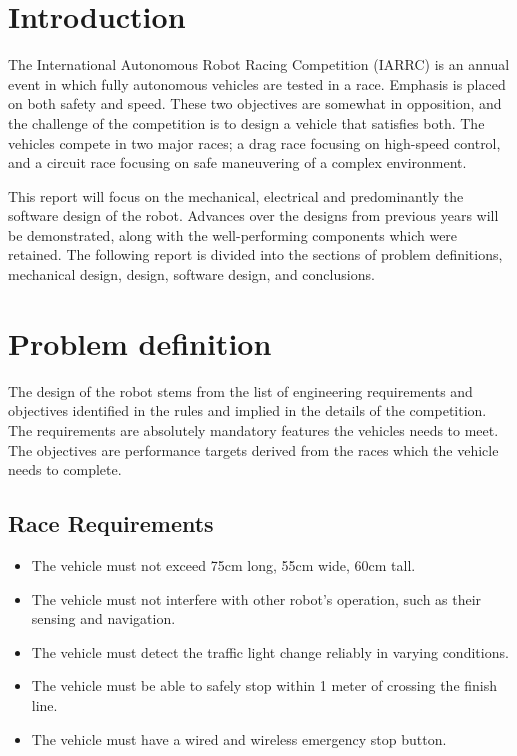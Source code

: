 \documentclass[11pt,journal]{IEEEtran}
\begin{document}
%
\IEEEpeerreviewmaketitle



\section{Introduction}
The International Autonomous Robot Racing Competition (IARRC) is an annual event in which fully autonomous vehicles are tested in a race. Emphasis is placed on both safety and speed. These two objectives are somewhat in opposition, and the challenge of the competition is to design a vehicle that satisfies both. The vehicles compete in two major races; a drag race focusing on high-speed control, and a circuit race focusing on safe maneuvering of a complex environment. 

This report will focus on the mechanical, electrical and predominantly the software design of the robot. Advances over the designs from previous years will be demonstrated, along with the well-performing components which were retained. The following report is divided into the sections of problem definitions, mechanical design, design, software design, and conclusions.

\section{Problem definition}
The design of the robot stems from the list of engineering requirements and objectives identified in the rules and implied in the details of the competition. The requirements are absolutely mandatory features the vehicles needs to meet. The objectives are performance targets derived from the races which the vehicle needs to complete.

\subsection{Race Requirements}

\begin{itemize}
  \item The vehicle must not exceed 75cm long, 55cm wide, 60cm tall.
  \item The vehicle must not interfere with other robot's operation, such as their sensing and navigation.
  \item The vehicle must detect the traffic light change reliably in varying conditions.
  \item The vehicle must be able to safely stop within 1 meter of crossing the finish line.
  \item The vehicle must have a wired and wireless emergency stop button.
\end{itemize}
\end{document}
